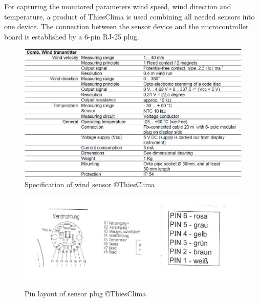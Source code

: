 For capturing the monitored parameters wind speed, wind direction and temperature, a product of ThiesClima is used combining all needed sensors into one device. The connection between the sensor device and the microcontroller board is established by a 6-pin RJ-25 plug.

\begin{figure}[ht]
    \centering
    \includegraphics[width=0.9\linewidth]{graphics/windsensor_specs.jpg}
    \caption{Specification of wind sensor \copyright ThiesClima}
    \label{fig:windsensor_spec}
\end{figure}
	
\begin{figure}[ht]
    \centering
    \includegraphics[width=0.8\linewidth]{graphics/windsensor_pinlayout.jpg}
    \caption{Pin layout of sensor plug \copyright ThiesClima}
    \label{fig:windsensor_pinlayout}
\end{figure}

\newpage